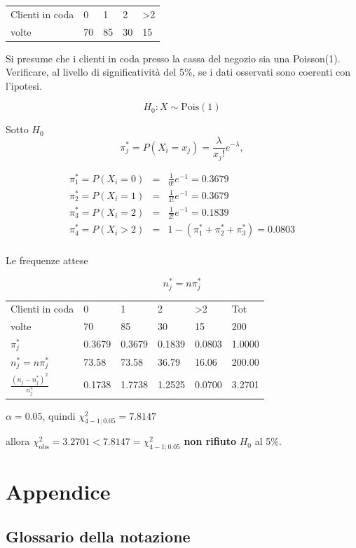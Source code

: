 \documentclass[
  11pt,
]{book}
\theoremstyle{mytheoremstyle}
\theoremstyle{mydefstyle}
\begin{document}
\begin{tabular}{lllll}
\toprule
Clienti in coda & 0 & 1 & 2 & >2\\
volte & 70 & 85 & 30 & 15\\
\bottomrule
\end{tabular}

Si presume che i clienti in coda presso la cassa del negozio sia una Poisson(1). Verificare, al livello di significatività del 5\%, se i dati osservati sono coerenti con l'ipotesi.

\[H_0:X\sim\text{Pois}(1)\]

Sotto \(H_0\)
\[\pi_j^*=P(X_i=x_j)=\frac \lambda{x_j!}e^{-\lambda},\]

\begin{eqnarray*}
   \pi_1^*=P(X_i=0)&=&\frac{1}{0!}e^{-1}=0.3679\\
   \pi_2^*=P(X_i=1)&=&\frac{1}{1!}e^{-1}=0.3679\\
   \pi_3^*=P(X_i=2)&=&\frac{1}{2!}e^{-1}=0.1839\\
   \pi_4^*=P(X_i>2)&=&1-(\pi_1^*+\pi_2^*+\pi_3^*)=0.0803\\
\end{eqnarray*}

Le frequenze attese

\[n_j^*=n\pi_j^*\]

\begin{tabular}{llllll}
\toprule
Clienti in coda & 0 & 1 & 2 & >2 & Tot\\
volte & 70 & 85 & 30 & 15 & 200\\
$\pi_j^*$ & 0.3679 & 0.3679 & 0.1839 & 0.0803 & 1.0000\\
$n_j^*=n\pi_j^*$ & 73.58 & 73.58 & 36.79 & 16.06 & 200.00\\
$\frac {(n_j-n_j^*)^2}{n_j^*}$ & 0.1738 & 1.7738 & 1.2525 & 0.0700 & 3.2701\\
\bottomrule
\end{tabular}

\(\alpha=0.05\), quindi \(\chi_{4-1;0.05}^2=7.8147\)

allora \(\chi^2_\text{obs}=3.2701<7.8147=\chi_{4-1;0.05}^2\)
\textbf{non rifiuto} \(H_0\) al 5\%.

\part{Appendice}

\appendix


\chapter{Glossario della notazione}\label{glossario-della-notazione}
\end{document}
